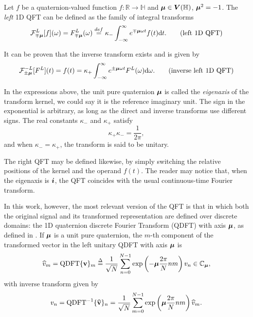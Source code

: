Let $f$ be a quaternion-valued function $f: \mathbb{R} \rightarrow \mathbb{H}$ and $\boldsymbol{\mu} \in \boldsymbol{V}(\mathbb{H})$, $\boldsymbol{\mu}^2 = -1$. The \textit{left} 1D QFT can be defined as the family of integral transforms
\begin{equation}
\mathcal{F}^L_{\mp \boldsymbol{\mu}}[f](\omega) = 
F^L_{\mp \boldsymbol{\mu}}(\omega) \overset{def}{=}
\kappa_{-} \int_{-\infty}^{\infty} e^{\mp \boldsymbol{\mu} \omega t} f(t) \mathrm{d}t.
\tag{left 1D QFT}
\end{equation}

It can be proven that the inverse transform exists and is given by
\begin{equation}
\mathcal{F}^{-L}_{\pm \boldsymbol{\mu}}[F^L](t) = 
f(t) =
\kappa_{+} \int_{-\infty}^{\infty} e^{\pm \boldsymbol{\mu} \omega t} F^L(\omega) \mathrm{d}\omega.
\tag{inverse left 1D QFT}
\end{equation}

In the expressions above, the unit pure quaternion $\boldsymbol{\mu}$ is called the \emph{eigenaxis} of the transform kernel, we could say it is the reference imaginary unit. The sign in the exponential is arbitrary, as long as the direct and inverse transforms use different signs. The real constants $\kappa_{-}$ and $\kappa_{+}$ satisfy
\begin{equation}
\kappa_{+} \kappa_{-} = \frac{1}{2\pi},
\end{equation}
\noindent and when $\kappa_{-} = \kappa_{+}$, the transform is said to be unitary.

The right QFT may be defined likewise, by simply switching the relative positions of the kernel and the operand $f(t)$. The reader may notice that, when the eigenaxis is $\boldsymbol{i}$, the QFT coincides with the usual continuous-time Fourier transform.

In this work, however, the most relevant version of the QFT is that in which both the original signal and its transformed representation are defined over discrete domains: the 1D quaternion discrete Fourier Transform (QDFT) with axis $ \boldsymbol{\mu} $, as defined in \cite[sec. 3.3.1]{ell2014quaternion}. If $ \boldsymbol{\mu} $ is a unit pure quaternion, the $ m $-th component of the transformed vector in the left unitary QDFT with axis $ \boldsymbol{\mu} $ is
\begin{equation}
\label{eq:QDFT_fwd}
\widehat{v}_m = \text{QDFT}\{ \mathbf{v} \}_m \overset{\Delta}{=} \frac{1}{\sqrt{N}} \sum_{n=0}^{N-1}  \exp \left( -\boldsymbol{\mu} \frac{2\pi}{N} nm \right) v_n \in \mathbb{C}_{\boldsymbol{\mu}},
\end{equation}
with inverse transform given by
\begin{equation}
\label{eq:QDFT_inv}
v_n = \text{QDFT}^{-1}\{ \widehat{\mathbf{v}} \}_n = \frac{1}{\sqrt{N}}\sum_{m=0}^{N-1}  \exp \left( \boldsymbol{\mu} \frac{2\pi}{N} nm \right) \widehat{v}_m.
\end{equation}

